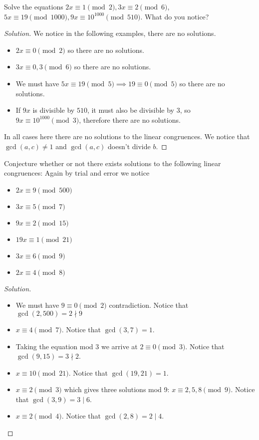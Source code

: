 \documentclass[12pt,openany]{book}
\theoremstyle{definition}
\newenvironment{soln}{\begin{proof}[Solution]}{\end{proof}}
\theoremstyle{definition}
\begin{document}
\begin{exmp}  Solve the equations $2x\equiv 1\pmod{2}, 3x\equiv 2\pmod{6}$, $5x\equiv 19\pmod{1000}, 9x\equiv 10^{1000}\pmod{510}$.  What do you notice? \end{exmp}
\begin{soln}  We notice in the following examples, there are no solutions.  \begin{itemize}
\item $2x\equiv 0\pmod{2}$ so there are no solutions.
\item  $3x\equiv 0,3\pmod{6}$ so there are no solutions.
\item  We must have $5x\equiv 19\pmod{5}\implies 19\equiv 0\pmod{5}$ so there are no solutions.
\item  If $9x$ is divisible by $510$, it must also be divisible by $3$, so $9x\equiv 10^{1000}\pmod{3}$, therefore there are no solutions.
\end{itemize}
In all cases here there are no solutions to the linear congruences.  We notice that $\gcd(a,c)\neq 1$ and $\gcd(a,c)$ doesn't divide $b$.    \end{soln}  

\begin{exmp}  Conjecture whether or not there exists solutions to the following linear congruences:
Again by trial and error we notice 
\begin{itemize}
\item  $2x\equiv 9\pmod{500}$
\item  $3x\equiv 5\pmod{7}$
\item  $9x\equiv 2\pmod{15}$
\item  $19x\equiv 1\pmod{21}$
\item  $3x\equiv 6\pmod{9}$
\item  $2x\equiv 4\pmod{8}$
\end{itemize} \end{exmp}

\begin{soln}
\begin{itemize}
Again by trial and error we notice
\item We must have $9\equiv 0\pmod{2}$ contradiction.  Notice that $\gcd(2,500)=2\nmid 9$
\item  $x\equiv 4\pmod{7}$.  Notice that $\gcd(3,7)=1$.  
\item  Taking the equation mod $3$ we arrive at $2\equiv 0\pmod{3}$. Notice that $\gcd(9,15)=3\nmid 2$.
\item  $x\equiv 10\pmod{21}$.  Notice that $\gcd(19,21)=1$.  
\item  $x\equiv 2\pmod{3}$ which gives three solutions mod 9:  $x\equiv 2,5,8\pmod{9}$.  Notice that $\gcd(3,9)=3\mid 6$.  
\item $x\equiv 2\pmod{4}$.  Notice that $\gcd(2,8)=2\mid 4$.
\end{itemize}
\end{soln}
\end{document}
